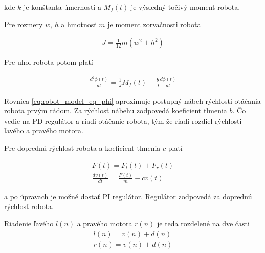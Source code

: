 kde $k$ je konštanta úmernosti a $M_f(t)$ je výsledný točivý moment robota.

Pre rozmery $w$, $h$ a hmotnosť $m$ je moment zorvačnosti robota

\begin{align}
  J = \frac{1}{12}m(w^2 + h^2)
\end{align}

Pre uhol robota potom platí

\begin{align}
  \frac{d^2\phi(t)}{dt} = \frac{1}{J}M_f(t) - \frac{b}{J}\frac{d\phi(t)}{dt}
  \label{eq:robot_model_eq_phi}
\end{align}

Rovnica \ref{eq:robot_model_eq_phi} aproximuje postupný nábeh rýchlosti
otáčania robota prvým rádom. Za rýchlosť nábehu zodpovedá koeficient tlmenia $b$. Čo vedie na PD regulátor a
riadi otáčanie robota, tým že riadi rozdiel rýchlosti ľavého a pravého motora.


Pre doprednú rýchlosť robota a koeficient tlmenia $c$ platí

\begin{align}
  F(t) = F_l(t) + F_r(t) \\
 \frac{dv(t)}{dt} = \frac{F(t)}{m} - cv(t)
\end{align}

a po úpravach je možné dostať PI regulátor. Regulátor zodpovedá za doprednú rýchlosť robota.

Riadenie ľavého $l(n)$ a pravého motora $r(n)$ je teda rozdelené na dve časti
\begin{align}
  l(n) = v(n) + d(n) \\
  r(n) = v(n) + d(n) \\
\end{align}

